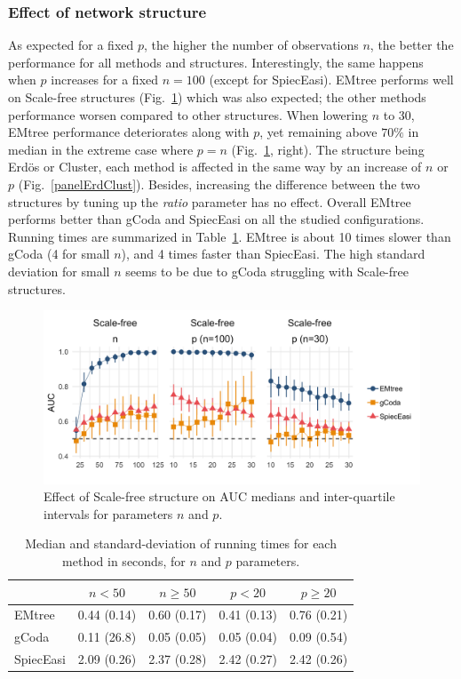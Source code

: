 
\subsubsection{Effect of network structure}

As expected for a fixed $p$, the higher the number of observations $n$, the better the performance for all methods and structures. Interestingly, the same happens when $p$ increases for a fixed $n=100$ (except for SpiecEasi).
EMtree performs well on Scale-free structures (Fig.~\ref{SFAUC}) which was also expected; the other methods performance worsen compared to other structures. When lowering $n$ to 30, EMtree performance deteriorates along with $p$, yet remaining above $70\%$ in median in the extreme case where $p=n$ (Fig.~\ref{SFAUC}, right). The structure being Erdös or Cluster, each method is affected in the same way by an increase of $n$ or $p$ (Fig.~\ref{panelErdClust}). Besides, increasing the difference between the two structures by tuning up the \textit{ratio} parameter has no effect. Overall EMtree performs better than gCoda and SpiecEasi on all the studied configurations. Running times are summarized in Table~\ref{timeNP}. EMtree is about 10 times slower than gCoda (4 for small $n$), and 4 times faster than SpiecEasi. The high standard deviation for small $n$ seems to be due to gCoda struggling with Scale-free structures.
  
\begin{figure}[H]
    \centering
    \includegraphics[width=0.7\linewidth]{figs/panel_SF.png}
    \caption{Effect of Scale-free structure on AUC medians and inter-quartile intervals for parameters $n$ and $p$.}
      \label{SFAUC}
\end{figure}


\begin{table}[H]
\centering
\begin{tabular}{l|rr|rr}
 & \multicolumn{1}{c}{$n < 50$} & \multicolumn{1}{c}{$n\geq 50$}  & \multicolumn{1}{c}{$p < 20$} & \multicolumn{1}{c}{$p\geq 20$} \\  
 \hline
  EMtree    &   0.44 (0.14)	 &   0.60 (0.17) &   0.41 (0.13) &   0.76 (0.21)   \\ 
  gCoda     &   0.11 (26.8)	 &   0.05 (0.05) &   0.05 (0.04) &   0.09 (0.54)   \\ 
  SpiecEasi &   2.09 (0.26)	 &   2.37 (0.28) &   2.42 (0.27) &   2.42 (0.26)   \\ 
   \hline
\end{tabular}
\caption{Median and standard-deviation of running times for each method in seconds, for $n$ and $p$ parameters.}
\label{timeNP}
\end{table}

